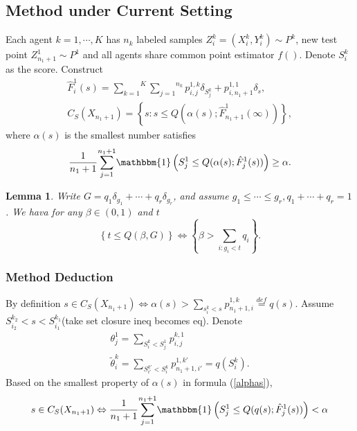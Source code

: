 \documentclass[12pt, a4paper, oneside]{article}
\newtheorem{lemma}[theorem]{Lemma}
\begin{document}
\subsection{Method under Current Setting}
    Each agent $k=1,\cdots,K$ has $n_k$ labeled samples $Z_i^k=(X_i^k,Y_i^k)\sim P^k$, new test point $Z_{n_1+1}^1\sim P^1$ and all agents share common point estimator $f()$. Denote $S_i^k$ as the score. Construct
    \begin{gather*}
        \hat{F}_i^1(s)=\overset{K}{\underset{k=1}\sum}\overset{n_k}{\underset{j=1}\sum}p_{i,j}^{1,k}\delta_{S_j^k}+p_{i,n_1+1}^{1,1}\delta_s,\\
        C_S(X_{n_1+1})=\left\{ s:s\leq Q(\alpha(s);\hat{F}_{n_1+1}^1(\infty)) \right\},
    \end{gather*}
    where $\alpha(s)$ is the smallest number satisfies
    \begin{equation}
        \dfrac{1}{n_1+1}\overset{n_1+1}{\underset{j=1}\sum}\mathbbm{1}\left( S_j^1\leq Q(\alpha(s);\hat{F}_j^1(s)) \right)\geq \alpha.\label{alphas}
    \end{equation}


    \begin{lemma}
        Write $G=q_1\delta_{g_1}+\cdots+q_r\delta_{g_r}$, and assume $g_1\leq\cdots\leq g_r,q_1+\cdots+q_r=1$. We hava for any $\beta\in(0,1)$ and $t$
        \begin{equation*}
            \left\{ t\leq Q(\beta,G) \right\}\Leftrightarrow\left\{ \beta>\overset{}{\underset{i:g_i<t}\sum}q_i \right\}.
        \end{equation*}
    \end{lemma}


    \subsubsection{Method Deduction}
    By definition $s\in C_S(X_{n_1+1})\Leftrightarrow\alpha(s)>\overset{}{\underset{s_i^k<s}\sum}p_{n_1+1,i}^{1,k}\overset{def}{=}q(s)$. Assume $S_{i_2}^{k_2}<s<S_{i_1}^{k_1}$(take set closure ineq becomes eq). Denote
    \begin{gather*}
        \theta_j^1=\overset{}{\underset{S_i^k<S_j^1}\sum}p_{i,j}^{k,1}\\
        \tilde{\theta}_i^k=\overset{}{\underset{S_{i'}^{k'}<S_i^k}\sum}p_{n_1+1,i'}^{1,k'}=q(S_i^k).
    \end{gather*}
    Based on the smallest property of $\alpha(s)$ in formula (\ref{alphas}),
    \begin{equation*}
        s\in C_S(X_{n_1+1})\Leftrightarrow\dfrac{1}{n_1+1}\overset{n_1+1}{\underset{j=1}\sum}\mathbbm{1}\left( S_j^1\leq Q(q(s);\hat{F}_j^1(s)) \right)<\alpha
    \end{equation*}
\end{document}
